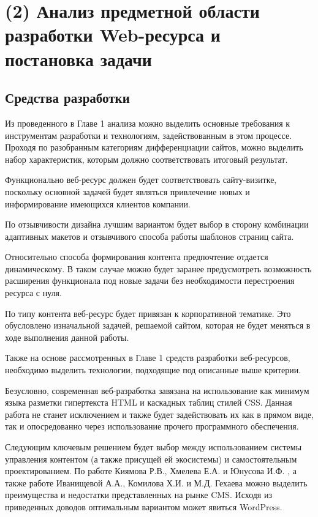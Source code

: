 \section{(2) Анализ предметной области разработки Web-ресурса и постановка задачи}


\subsection{Средства разработки}

Из проведенного в Главе 1 анализа можно выделить основные требования к инструментам разработки и технологиям, задействованным в этом процессе.
Проходя по разобранным категориям дифференциации сайтов, можно выделить набор характеристик, которым должно соответствовать итоговый результат.

Функционально веб-ресурс должен будет соответствовать сайту-визитке, поскольку основной задачей будет являться привлечение новых и информирование имеющихся клиентов компании.

По отзывчивости дизайна лучшим вариантом будет выбор в сторону комбинации адаптивных макетов и отзывчивого способа работы шаблонов страниц сайта.

Относительно способа формирования контента предпочтение отдается динамическому.
В таком случае можно будет заранее предусмотреть возможность расширения функционала под новые задачи без необходимости перестроения ресурса с нуля.

По типу контента веб-ресурс будет привязан к корпоративной тематике.
Это обусловлено изначальной задачей, решаемой сайтом, которая не будет меняться в ходе выполнения данной работы.

Также на основе рассмотренных в Главе 1 средств разработки веб-ресурсов, необходимо выделить технологии, подходящие под описанные выше критерии.

Безусловно, современная веб-разработка завязана на использование как минимум языка разметки гипертекста HTML и каскадных таблиц стилей CSS.
Данная работа не станет исключением и также будет задействовать их как в прямом виде, так и опосредованно через использование прочего программного обеспечения.

Следующим ключевым решением будет выбор между использованием системы управления контентом (а также присущей ей экосистемы) и самостоятельным проектированием.
По работе Киямова Р.В., Хмелева Е.А. и Юнусова И.Ф. \cite{kiyamov-cms}, а также работе Иванищевой А.А., Комилова Х.И. и М.Д. Гехаева \cite{ivanisheva-cms} можно выделить преимущества и недостатки представленных на рынке CMS.
Исходя из приведенных доводов оптимальным вариантом может явиться WordPress.

